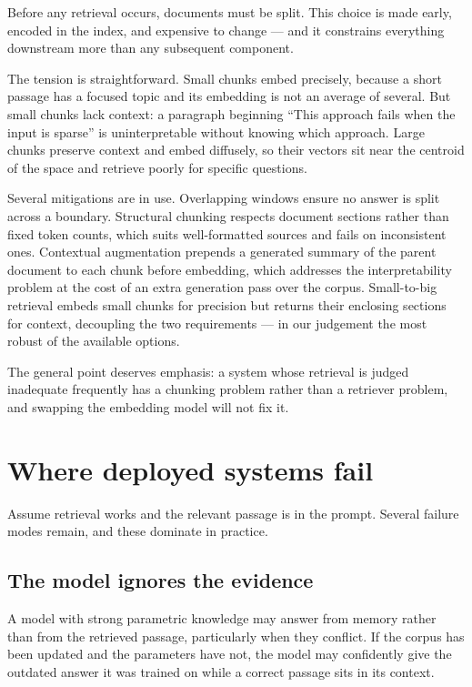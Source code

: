 \documentclass[11pt,a4paper]{article}
\begin{document}
Before any retrieval occurs, documents must be split. This choice is made
early, encoded in the index, and expensive to change --- and it constrains
everything downstream more than any subsequent component.

The tension is straightforward. Small chunks embed precisely, because a short
passage has a focused topic and its embedding is not an average of several.
But small chunks lack context: a paragraph beginning ``This approach fails
when the input is sparse'' is uninterpretable without knowing which approach.
Large chunks preserve context and embed diffusely, so their vectors sit near
the centroid of the space and retrieve poorly for specific questions.

Several mitigations are in use. Overlapping windows ensure no answer is split
across a boundary. Structural chunking respects document sections rather than
fixed token counts, which suits well-formatted sources and fails on
inconsistent ones. Contextual augmentation prepends a generated summary of the
parent document to each chunk before embedding, which addresses the
interpretability problem at the cost of an extra generation pass over the
corpus. Small-to-big retrieval embeds small chunks for precision but returns
their enclosing sections for context, decoupling the two requirements --- in
our judgement the most robust of the available options.

The general point deserves emphasis: a system whose retrieval is judged
inadequate frequently has a chunking problem rather than a retriever problem,
and swapping the embedding model will not fix it.

\section{Where deployed systems fail}
\label{sec:failures}

Assume retrieval works and the relevant passage is in the prompt. Several
failure modes remain, and these dominate in practice.

\subsection{The model ignores the evidence}

A model with strong parametric knowledge may answer from memory rather than
from the retrieved passage, particularly when they conflict. If the corpus has
been updated and the parameters have not, the model may confidently give the
outdated answer it was trained on while a correct passage sits in its context.
\end{document}
